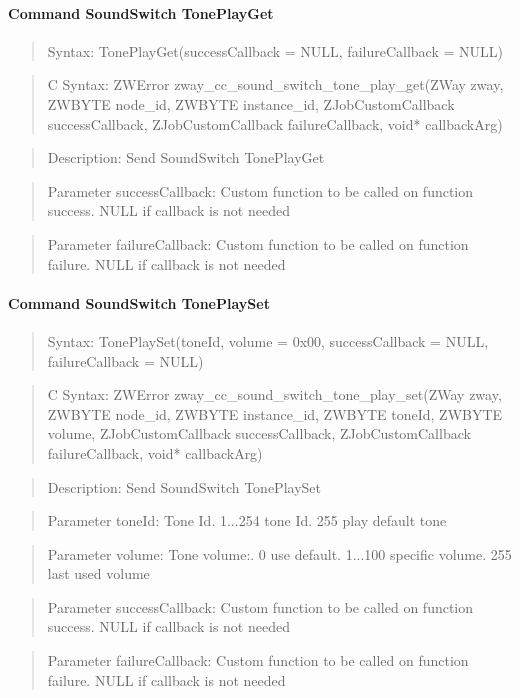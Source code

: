 \paragraph{Command SoundSwitch TonePlayGet}
\begin{quote}Syntax: TonePlayGet(successCallback = NULL, failureCallback = NULL)\end{quote}
\begin{quote}C Syntax: ZWError zway\_cc\_sound\_switch\_tone\_play\_get(ZWay zway, ZWBYTE node\_id, ZWBYTE instance\_id, ZJobCustomCallback successCallback, ZJobCustomCallback failureCallback, void* callbackArg)\end{quote}
\begin{quote}Description: Send SoundSwitch TonePlayGet\end{quote}
\begin{quote}Parameter successCallback: Custom function to be called on function success. NULL if callback is not needed\end{quote}
\begin{quote}Parameter failureCallback: Custom function to be called on function failure. NULL if callback is not needed\end{quote}


\paragraph{Command SoundSwitch TonePlaySet}
\begin{quote}Syntax: TonePlaySet(toneId, volume = 0x00, successCallback = NULL, failureCallback = NULL)\end{quote}
\begin{quote}C Syntax: ZWError zway\_cc\_sound\_switch\_tone\_play\_set(ZWay zway, ZWBYTE node\_id, ZWBYTE instance\_id, ZWBYTE toneId, ZWBYTE volume, ZJobCustomCallback successCallback, ZJobCustomCallback failureCallback, void* callbackArg)\end{quote}
\begin{quote}Description: Send SoundSwitch TonePlaySet\end{quote}
\begin{quote}Parameter toneId: Tone Id. 1...254 tone Id. 255 play default tone\end{quote}
\begin{quote}Parameter volume: Tone volume:. 0 use default. 1...100 specific volume. 255 last used volume\end{quote}
\begin{quote}Parameter successCallback: Custom function to be called on function success. NULL if callback is not needed\end{quote}
\begin{quote}Parameter failureCallback: Custom function to be called on function failure. NULL if callback is not needed\end{quote}


